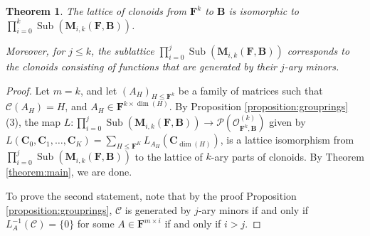 \documentclass[11pt]{amsart}
\theoremstyle{plain}
\newtheorem{theorem}[thm]{Theorem}
\theoremstyle{definition}
\newcommand{\F}{{\mathbf F}}
\DeclareMathOperator{\Sub}{Sub}
\newcommand{\alg}[1]{\mathbf{#1}}
\newcommand{\clone}[1]{\mathcal{#1}}
\newcommand{\clonoid}[1]{\mathcal{#1}}
\newcommand{\clodC}{\clonoid{C}}
\newcommand{\clodO}{\clonoid{O}}
\newcommand{\algB}{\alg{B}}
\newcommand{\algC}{\alg{C}}
\newcommand{\algM}{\alg{M}}
\newcommand{\algR}{\alg{R}}
\newcommand{\cloC}{\clone{C}}
\DeclareMathOperator{\rk}{rk}
\newcommand{\Col}[1]{\mathcal{C}(#1)}
\begin{document}
\begin{theorem} \label{theorem:clonoidlattice}
The lattice of clonoids from $\F^k$ to $\algB$ is isomorphic to $\prod_{i=0}^k \Sub(\algM_{i,k}(\F,\algB))$.

Moreover, for $j\leq k$, the sublattice $\prod_{i=0}^j \Sub(\algM_{i,k}(\F,\algB))$ corresponds to the clonoids consisting of functions that are generated by their $j$-ary minors.
\end{theorem}

\begin{proof}
Let $m = k$, and let $(A_H)_{H \leq \F^k}$ be a family of matrices such that $\Col{A_H} = H$, and $A_H \in \F^{k \times \dim(H)}$. By Proposition \ref{proposition:grouprings} (3), the map $L \colon \prod_{i=0}^j \Sub(\algM_{i,k}(\F,\algB)) \to \mathcal P(\clodO_{\F^k,\algB}^{(k)})$ given by $L(\algC_0, \algC_1,\ldots,\algC_K) = \sum_{H\leq \F^K} L_{A_H}(\algC_{\dim(H)})$, is a lattice isomorphism from $\prod_{i=0}^j \Sub(\algM_{i,k}(\F,\algB))$ to the lattice of $k$-ary parts of clonoids. By Theorem \ref{theorem:main}, we are done.

To prove the second statement, note that by the proof Proposition \ref{proposition:grouprings}, $\cloC$ is generated by $j$-ary minors if and only if $L_A^{-1}(\cloC) = \{0\}$ for some $A\in \F^{m\times i}$ if and only if $i>j$.
\end{proof}

\end{document}
